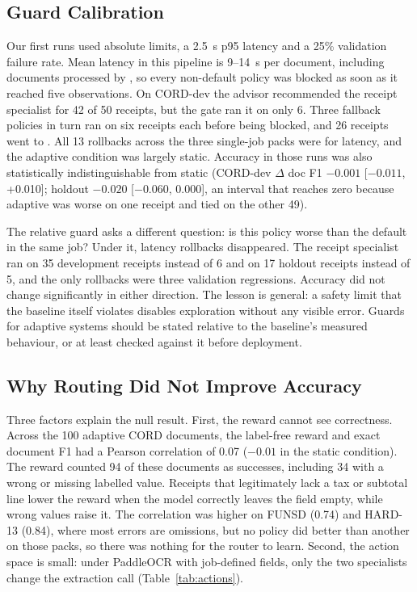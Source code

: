 \documentclass[conference,a4paper]{IEEEtran}
\newcommand{\pol}[1]{\texttt{\detokenize{#1}}}
\begin{document}
\subsection{Guard Calibration}
\label{sec:guard}
Our first runs used absolute limits, a 2.5~s p95 latency and a 25\% validation failure rate. Mean latency in this pipeline is 9--14~s per document, including documents processed by \pol{default}, so every non-default policy was blocked as soon as it reached five observations. On CORD-dev the advisor recommended the receipt specialist for 42 of 50 receipts, but the gate ran it on only 6. Three fallback policies in turn ran on six receipts each before being blocked, and 26 receipts went to \pol{default}. All 13 rollbacks across the three single-job packs were for latency, and the adaptive condition was largely static. Accuracy in those runs was also statistically indistinguishable from static (CORD-dev $\Delta$ doc F1 $-0.001$ [$-0.011$, +0.010]; holdout $-0.020$ [$-0.060$, 0.000], an interval that reaches zero because adaptive was worse on one receipt and tied on the other 49).

The relative guard asks a different question: is this policy worse than the default in the same job? Under it, latency rollbacks disappeared. The receipt specialist ran on 35 development receipts instead of 6 and on 17 holdout receipts instead of 5, and the only rollbacks were three validation regressions. Accuracy did not change significantly in either direction. The lesson is general: a safety limit that the baseline itself violates disables exploration without any visible error. Guards for adaptive systems should be stated relative to the baseline's measured behaviour, or at least checked against it before deployment.

\subsection{Why Routing Did Not Improve Accuracy}
\label{sec:why}
Three factors explain the null result. First, the reward cannot see correctness. Across the 100 adaptive CORD documents, the label-free reward and exact document F1 had a Pearson correlation of 0.07 ($-0.01$ in the static condition). The reward counted 94 of these documents as successes, including 34 with a wrong or missing labelled value. Receipts that legitimately lack a tax or subtotal line lower the reward when the model correctly leaves the field empty, while wrong values raise it. The correlation was higher on FUNSD (0.74) and HARD-13 (0.84), where most errors are omissions, but no policy did better than another on those packs, so there was nothing for the router to learn. Second, the action space is small: under PaddleOCR with job-defined fields, only the two specialists change the extraction call (Table~\ref{tab:actions}).
\end{document}
